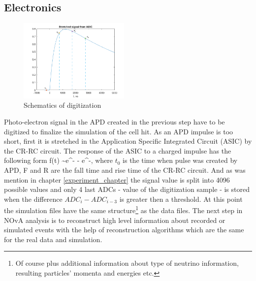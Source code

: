 \subsection{Electronics}
\begin{figure}
\vspace{-20pt}
  \begin{center}
    \includegraphics[width=0.48\textwidth]{figures/digit_scheme.png}
  \end{center}
\vspace{1mm}
\caption{Schematics of digitization}
\end{figure}
Photo-electron signal in the APD created in the previous step have to be digitized to finalize the simulation
of the cell hit. As an APD impulse is too short, first it is stretched in the Application Specific Integrated 
Circuit (ASIC) by the CR-RC circuit. The response of the ASIC to a charged impulse has the following form
\be
f(t) \sim e^{-} - e^{-},
\ee
where $t_0$ is the time when pulse was created by APD, F and R are the fall time and rise time of the CR-RC 
circuit. And as was mention in chapter \ref{experiment_chapter} the signal value is split into 4096 possible
values and only 4 last ADCs - value of the digitization sample - is stored when the difference $ADC_i - ADC_{i-3}$
is greater then a threshold. 
At this point the simulation files have the same structure\footnote{Of course plus additional information about type 
of neutrino information, resulting particles' momenta and energies etc.} as the data files.
The next step in NOvA analysis is to reconstruct high level information about recorded or simulated events
with the help of reconstruction algorithms which are the same for the real data and simulation.
